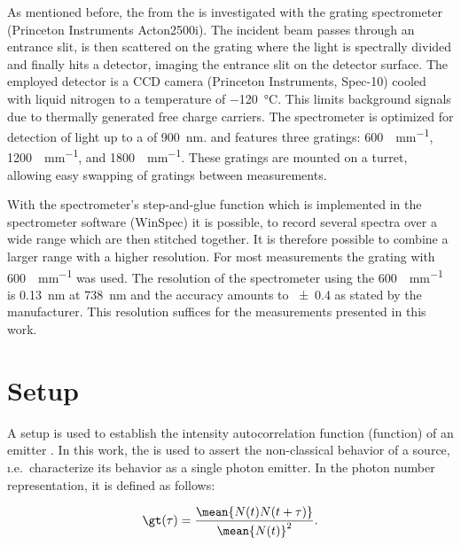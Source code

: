 		As mentioned before, the \fl from the \sivs is investigated with the grating spectrometer (Princeton Instruments Acton2500i).
		The incident beam passes through an entrance slit, is then scattered on the grating where the light is spectrally divided and finally hits a detector, imaging the entrance slit on the detector surface.
		The employed detector is a CCD camera (Princeton Instruments, Spec-10) cooled with liquid nitrogen to a temperature of \SI{-120}{\celsius}. This limits background signals due to thermally generated free charge carriers.
		The spectrometer is optimized for detection of light up to a \wl of \SI{900}{nm}.
		and features three gratings: \SI[per-mode=symbol]{600}{\lines\per\mm}, \SI[per-mode=symbol]{1200}{\lines\per\mm}, and \SI[per-mode=symbol]{1800}{\lines\per\mm}.
		These gratings are mounted on a turret, allowing easy swapping of gratings between measurements.

		With the spectrometer's step-and-glue function which is implemented in the spectrometer software (WinSpec) it is possible, to record several spectra over a wide \wl range which are then stitched together.
		It is therefore possible to combine a larger \wl range with a higher resolution.
		For most measurements the grating with \SI[per-mode=symbol]{600}{\lines\per\mm} was used.
		The resolution of the spectrometer using the \SI{600}{\lines\per\mm} is \SI{0.13}{nm} at \SI{738}{nm} and the accuracy amounts to \num{\pm0.4} as stated by the manufacturer.
		This resolution suffices for the measurements presented in this work.

	\section[HBT]{\HBT Setup}\label{sec::methods_hbt}

		A \HBT setup is used to establish the intensity autocorrelation function (\gt function) of an emitter \cite{brown1956correlation, brown1956test}.
		In this work, the \gtf is used to assert the non-classical behavior of a \pl source, \i.e.\ characterize its behavior as a single photon emitter.
		In the photon number representation, it is defined as follows:

		\begin{equation}
		\gt(\tau) = \frac{ \mean{ N(t) N(t+\tau) } }{\mean{N(t)}^2}.
		\end{equation}

